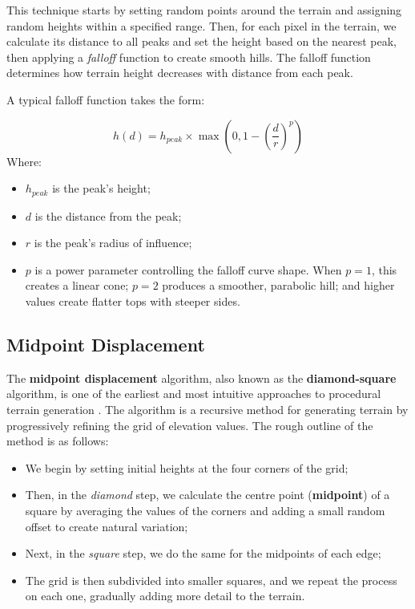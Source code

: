 This technique starts by setting random points around the terrain and assigning random heights within a specified range. Then, for each pixel in the terrain, we calculate its distance to all peaks and set the height based on the nearest peak, then applying a \textit{falloff} function to create smooth hills. The falloff function determines how terrain height decreases with distance from each peak. 

A typical falloff function takes the form:

\[h(d) = h_{peak} \times \max(0, 1 - (\frac{d}{r})^p) \]
Where:
\begin{itemize}
    \item $h_{peak}$ is the peak's height;
    \item $d$ is the distance from the peak;
    \item $r$ is the peak's radius of influence;
    \item $p$ is a power parameter controlling the falloff curve shape. When $p = 1$, this creates a linear cone; $p = 2$ produces a smoother, parabolic hill; and higher values create flatter tops with steeper sides. 
\end{itemize}

\subsection{Midpoint Displacement}
\label{midpoint_displacement}

The \textbf{midpoint displacement} algorithm, also known as the \textbf{diamond-square} algorithm, is one of the earliest and most intuitive approaches to procedural terrain generation \citep{Olsen04}. The algorithm is a recursive method for generating terrain by progressively refining the grid of elevation values. The rough outline of the method is as follows:

\begin{itemize}
    \item[-] We begin by setting initial heights at the four corners of the grid;
    \item[-]  Then, in the \textit{diamond} step, we calculate the centre point (\textbf{midpoint}) of a square by averaging the values of the corners and adding a small random offset to create natural variation;
    \item[-] Next, in the \textit{square} step, we do the same for the midpoints of each edge; 
    \item[-] The grid is then subdivided into smaller squares, and we repeat the process on each one, gradually adding more detail to the terrain.
\end{itemize}

